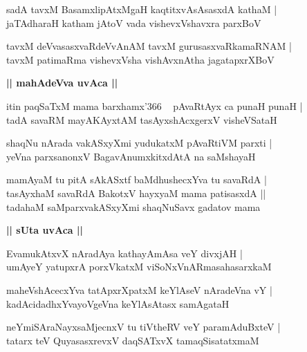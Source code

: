 \documentclass[twoside,12pt,openright]{book}
\newcounter{shloka}[chapter]
\def\uvaca#1{\centerline{{\large\textbf{#1}}}}
\begin{document}
\begin{shloka}%
sadA tavxM BasamxlipAtxMgaH kaqtitxvAsAsasxdA kathaM |\\
jaTAdharaH katham jAtoV vada vishevxVshavxra parxBoV 
\end{shloka}

\begin{shloka}%
tavxM deVvasasxvaRdeVvAnAM tavxM gurusasxvaRkamaRNAM |\\
tavxM patimaRma vishevxVsha vishAvxnAtha jagatapxrXBoV
\end{shloka}

\uvaca{|| mahAdeVva uvAca ||}

\begin{shloka}%
itin paqSaTxM mama barxhamx\char'366 ~ pAvaRtAyx ca punaH punaH |\\
tadA savaRM mayAKAyxtAM tasAyxshAcxgerxV visheVSataH 
\end{shloka}

\begin{shloka}%
shaqNu nArada vakASxyXmi yudukatxM pAvaRtiVM parxti |\\
yeVna parxsanonxV BagavAnumxkitxdAtA na saMshayaH 
\end{shloka}

\begin{shloka}%
mamAyaM tu pitA sAkASxtf baMdhushecxYva tu savaRdA |\\
tasAyxhaM savaRdA BakotxV hayxyaM mama patisasxdA ||\\
tadahaM saMparxvakASxyXmi shaqNuSavx gadatov mama
\end{shloka}

\uvaca{|| sUta uvAca ||}

\begin{shloka}%
EvamukAtxvX nAradAya kathayAmAsa veY divxjAH |\\
umAyeY yatupxrA porxVkatxM viSoNxVnARmasahasarxkaM 
\end{shloka}

\begin{shloka}%
maheVshAcecxYva tatApxrXpatxM keYlAseV nAradeVna vY |\\
kadAcidadhxYvayoVgeVna keYlAsAtasx samAgataH
\end{shloka}

\begin{shloka}%
neYmiSAraNayxsaMjecnxV tu tiVtheRV veY paramAduBxteV |\\
tatarx teV QuyasasxrevxV daqSATxvX tamaqSisatatxmaM 
\end{shloka}
\end{document}
